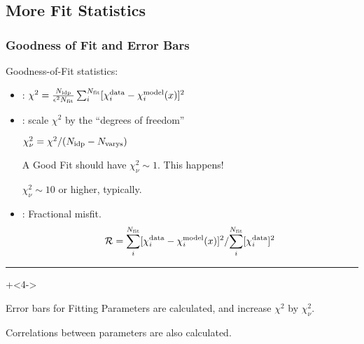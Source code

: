 \subsection{More Fit Statistics}
\begin{frame}
\frametitle{Goodness of Fit and Error Bars}

  Goodness-of-Fit statistics:
  \begin{itemize}[<+->]
  \item{}:     $  \chi^2  =  \frac{ N_{\rm idp}}{\epsilon^2 N_{\rm fit}}
    \sum_i^{N_{\rm fit}} [\chi_i^{\rm data} - \chi_i^{\rm model}({x})]^2   $

  \item{}:  scale $\chi^2$ by the  ``degrees of freedom''

    $ \chi^2_\nu =  \chi^2 / (N_{\rm idp}-N_{\rm varys}) $

    A Good Fit should have $\chi^2_\nu \sim 1$. This {}
    happens!

    $ \chi^2_\nu \sim 10 $ or higher, typically.


  \item{}:  Fractional misfit.
    \[
    {\cal{R}} =
    {\sum_i^{N_{\rm fit}}[\chi_i^{\rm data} - \chi_i^{\rm model}({x})]^2 }
    /
    { \displaystyle{\sum_i^{N_{\rm fit}} [{\chi_i^{\rm data}}]^2}}
    \]

  \end{itemize}

\hrule \vmm \onslide+<4->

  Error bars for Fitting Parameters are calculated, and
  increase $\chi^2$ by $\chi^2_\nu$.

  \vmm
  Correlations between parameters are also calculated.

\end{frame}
